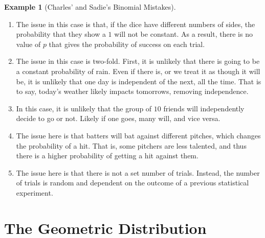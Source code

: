\documentclass[
  letterpaper,
  DIV=11,
  numbers=noendperiod]{scrreprt}
\providecommand{\tightlist}{%
  \setlength{\itemsep}{0pt}\setlength{\parskip}{0pt}}\usepackage{longtable,booktabs,array}
\theoremstyle{definition}
\theoremstyle{definition}
\newtheorem{example}{Example}[chapter]
\theoremstyle{definition}
\theoremstyle{remark}
\begin{document}
\begin{example}[Charles' and Sadie's Binomial
Mistakes]
\begin{tcolorbox}[enhanced jigsaw, colback=white, colframe=quarto-callout-color-frame, arc=.35mm, leftrule=.75mm, rightrule=.15mm, opacityback=0, breakable, bottomrule=.15mm, left=2mm, toprule=.15mm]
\begin{enumerate}
\def\labelenumi{\alph{enumi}.}
\tightlist
\item
  The issue in this case is that, if the dice have different numbers of
  sides, the probability that they show a \(1\) will not be constant. As
  a result, there is no value of \(p\) that gives the probability of
  success on each trial.
\item
  The issue in this case is two-fold. First, it is unlikely that there
  is going to be a constant probability of rain. Even if there is, or we
  treat it as though it will be, it is unlikely that one day is
  independent of the next, all the time. That is to say, today's weather
  likely impacts tomorrows, removing independence.
\item
  In this case, it is unlikely that the group of \(10\) friends will
  independently decide to go or not. Likely if one goes, many will, and
  vice versa.
\item
  The issue here is that batters will bat against different pitches,
  which changes the probability of a hit. That is, some pitchers are
  less talented, and thus there is a higher probability of getting a hit
  against them.
\item
  The issue here is that there is not a set number of trials. Instead,
  the number of trials is random and dependent on the outcome of a
  previous statistical experiment.
\end{enumerate}

\end{tcolorbox}

\end{example}

\section{The Geometric Distribution}\label{the-geometric-distribution}
\end{document}

